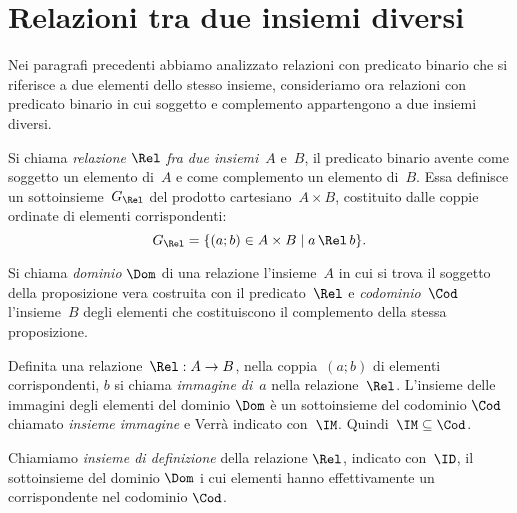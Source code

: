 \ovalbox{\risolvii \ref{ese:7.38}, \ref{ese:7.39}, \ref{ese:7.40}, \ref{ese:7.41}, \ref{ese:7.42}, \ref{ese:7.43}}

\section{Relazioni tra due insiemi diversi}

Nei paragrafi precedenti abbiamo analizzato relazioni con predicato binario che si riferisce a due elementi dello stesso insieme, consideriamo ora relazioni con predicato binario in cui soggetto e complemento appartengono a due insiemi diversi.

\begin{definizione}
Si chiama \emph{relazione} $\Rel$ \emph{fra due insiemi}~$A$ e~$B$, il predicato binario avente come soggetto un elemento di~$A$ e come complemento un elemento di~$B$.
Essa definisce un sottoinsieme~$G_\Rel$ del prodotto cartesiano~$A \times B$, costituito dalle coppie ordinate di elementi corrispondenti:
\[ G_\Rel=\{(a;b)\in A \times B \mid  a \,\Rel\, b \}.\]
\end{definizione}

\begin{definizione}
Si chiama \emph{dominio} $\Dom$ di una relazione l'insieme~$A$ in cui si trova il soggetto della proposizione vera costruita con il predicato~$\Rel$ e \emph{codominio}~$\Cod$
l'insieme~$B$ degli elementi che costituiscono il complemento della stessa proposizione.
\end{definizione}

\begin{definizione}
Definita una relazione~$\Rel:A \rightarrow B$, nella coppia~$(a;b)$ di elementi corrispondenti, $b$ si chiama \emph{immagine di}~$a$ nella relazione~$\Rel$.
L'insieme delle immagini degli elementi del dominio $\Dom$ è un sottoinsieme del codominio $\Cod$ chiamato \emph{insieme immagine} e Verrà indicato con~$\IM$. Quindi~$\IM \subseteq\Cod$.
\end{definizione}

\begin{definizione}
Chiamiamo \emph{insieme di definizione} della relazione $\Rel$, indicato con~$\ID$, il sottoinsieme del dominio $\Dom$ i cui elementi hanno effettivamente un corrispondente nel codominio $\Cod$.
\end{definizione}

